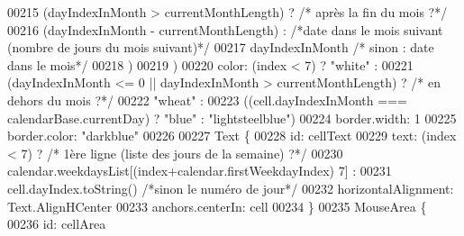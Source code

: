 \begin{DoxyCode}
{{{00215                                                                                                            
                                  (dayIndexInMonth > currentMonthLength) ? \textcolor{comment}{/* après la fin du mois ?*/}
00216                                                                                                            
                                                                           (dayIndexInMonth - currentMonthLength) 
      : \textcolor{comment}{/*date dans le mois suivant (nombre de jours du mois suivant)*/}
00217                                                                                                            
                                                                           dayIndexInMonth \textcolor{comment}{/* sinon : date dans le
       mois*/}
00218                                                                                                            
                                  )
00219                                                                   )
00220                         color: (index < 7) ? \textcolor{stringliteral}{"white"} :
00221                                              (dayIndexInMonth <= 0 || dayIndexInMonth > currentMonthLength)
       ? \textcolor{comment}{/* en dehors du mois ?*/}
00222                                                                                                            
         \textcolor{stringliteral}{"wheat"} :
00223                                                                                                            
         ((cell.dayIndexInMonth === calendarBase.currentDay) ? \textcolor{stringliteral}{"blue"} : \textcolor{stringliteral}{"lightsteelblue"})
00224                         border.width: 1
00225                         border.color: \textcolor{stringliteral}{"darkblue"}
00226 
00227                         Text \{
00228                             \textcolor{keywordtype}{id}: cellText
00229                             text: (index < 7) ? \textcolor{comment}{/* 1ère ligne (liste des jours de la semaine) ?*/}
00230                                                 calendar.weekdaysList[(index+calendar.firstWeekdayIndex) %
      7] :
00231                                                 cell.dayIndex.toString() \textcolor{comment}{/*sinon le numéro de jour*/}
00232                             horizontalAlignment: Text.AlignHCenter
00233                             anchors.centerIn: cell
00234                         \}
00235                         MouseArea \{
00236                             \textcolor{keywordtype}{id}: cellArea
}}}
\end{DoxyCode}

